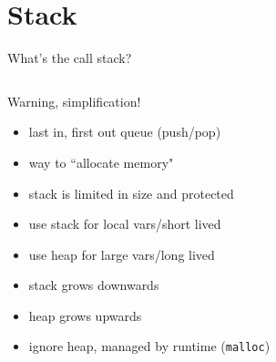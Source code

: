 \documentclass[table,xetex,12pt,aspectratio=169]{beamer}
\begin{document}
\section{Stack}

\begin{frame}{What's the call stack?}
\begin{columns}
\begin{column}{0.7\textwidth}
\alert{Warning, simplification!}
\begin{itemize}
\item last in, first out queue (push/pop)
\item way to ``allocate memory"
\item stack is limited in size and protected
\item use stack for local vars/short lived
\item use heap for large vars/long lived
\item stack grows downwards
\item heap grows upwards
\item ignore heap, managed by runtime (\texttt{malloc})
\end{itemize}
\end{column}
\begin{column}{0.3\textwidth}\pause
{}
\end{column}
\end{columns}
\end{frame}
\end{document}
